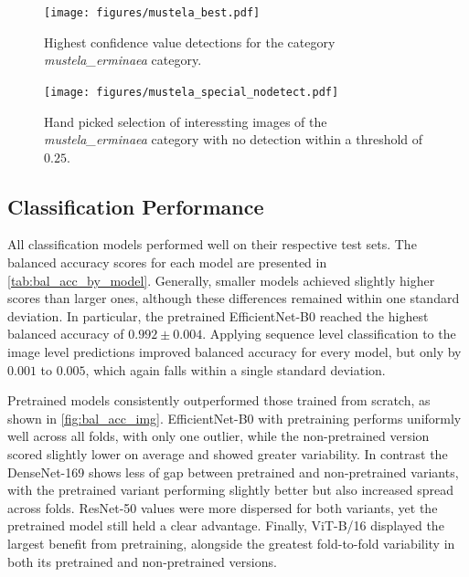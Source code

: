     

    \begin{figure}[]
    \centering
    \texttt{[image: figures/mustela\_best.pdf]}
    \caption{Highest confidence value detections for the category \textit{mustela\_erminaea} category.}
    \label{fig:detection_mustela_best}
    \end{figure}

    \begin{figure}[]
    \centering
    \texttt{[image: figures/mustela\_special\_nodetect.pdf]}
    \caption{Hand picked selection of interessting images of the \textit{mustela\_erminaea} category with no detection within a threshold of \(0.25\).}
    \label{fig:detection_special_nodetect}
    \end{figure}


    \subsection{Classification Performance}

    All classification models performed well on their respective test sets.
    The balanced accuracy scores for each model are presented in \autoref{tab:bal_acc_by_model}.
    Generally, smaller models achieved slightly higher scores than larger ones, although these differences remained within one standard deviation.
    In particular, the pretrained EfficientNet-B0 reached the highest balanced accuracy of \(0.992\pm0.004\).
    Applying sequence level classification to the image level predictions improved balanced accuracy for every model, but only by \(0.001\) to \(0.005\), which again falls within a single standard deviation.

    Pretrained models consistently outperformed those trained from scratch, as shown in \autoref{fig:bal_acc_img}.
    EfficientNet-B0 with pretraining performs uniformly well across all folds, with only one outlier, while the non-pretrained version scored slightly lower on average and showed greater variability.
    In contrast the DenseNet-169 shows less of gap between pretrained and non-pretrained variants, with the pretrained variant performing slightly better but also increased spread across folds.
    ResNet-50 values were more dispersed for both variants, yet the pretrained model still held a clear advantage. 
    Finally, ViT-B/16 displayed the largest benefit from pretraining, alongside the greatest fold-to-fold variability in both its pretrained and non-pretrained versions.

